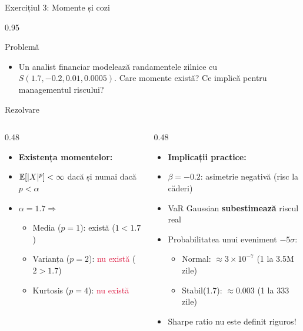 \documentclass[9pt, aspectratio=169, t]{beamer}
\begin{document}
\begin{frame}{Exercițiul 3: Momente și cozi}
    \begin{cminipage}{0.95\textwidth}
\begin{block}{Problemă}
\begin{itemize}\setlength{\itemsep}{0pt}
    \item Un analist financiar modelează randamentele zilnice cu $S(1.7, -0.2, 0.01, 0.0005)$. Care momente există? Ce implică pentru managementul riscului?
\end{itemize}
\end{block}

\begin{exampleblock}{Rezolvare}
\begin{columns}[T]
\begin{column}{0.48\textwidth}
\begin{itemize}\setlength{\itemsep}{0pt}
    \item \textbf{Existența momentelor:}
    \item $\mathbb{E}[|X|^p] < \infty$ dacă și numai dacă $p < \alpha$
    \item $\alpha = 1.7 \Rightarrow$
    \begin{itemize}\setlength{\itemsep}{0pt}
        \item Media ($p=1$): \textcolor{Forest}{există} ($1 < 1.7$)
        \item Varianța ($p=2$): \textcolor{Crimson}{nu există} ($2 > 1.7$)
        \item Kurtosis ($p=4$): \textcolor{Crimson}{nu există}
    \end{itemize}
\end{itemize}
\end{column}
\begin{column}{0.48\textwidth}
\begin{itemize}\setlength{\itemsep}{0pt}
    \item \textbf{Implicații practice:}
    \item $\beta = -0.2$: asimetrie negativă (risc la căderi)
    \item VaR Gaussian \textbf{subestimează} riscul real
    \item Probabilitatea unui eveniment $-5\sigma$:
    \begin{itemize}\setlength{\itemsep}{0pt}
        \item Normal: $\approx 3 \times 10^{-7}$ (1 la 3.5M zile)
        \item Stabil(1.7): $\approx 0.003$ (1 la 333 zile)
    \end{itemize}
    \item Sharpe ratio nu este definit riguros!
\end{itemize}
\end{column}
\end{columns}
\end{exampleblock}
    \end{cminipage}
\end{frame}
\end{document}
